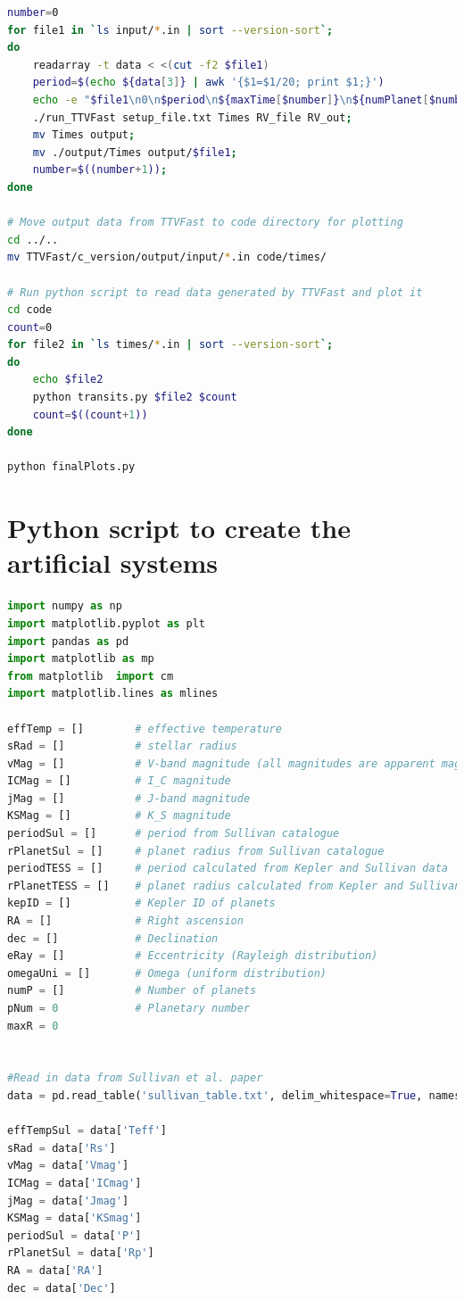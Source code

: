 \documentclass[12pt]{report}
\begin{document}
\begin{appendix}
\begin{lstlisting}[language=Bash]
number=0
for file1 in `ls input/*.in | sort --version-sort`;
do
	readarray -t data < <(cut -f2 $file1)
	period=$(echo ${data[3]} | awk '{$1=$1/20; print $1;}')
	echo -e "$file1\n0\n$period\n${maxTime[$number]}\n${numPlanet[$number]}\n0" > setup_file.txt;  		
	./run_TTVFast setup_file.txt Times RV_file RV_out;
	mv Times output;
	mv ./output/Times output/$file1;
	number=$((number+1));
done

# Move output data from TTVFast to code directory for plotting
cd ../..
mv TTVFast/c_version/output/input/*.in code/times/

# Run python script to read data generated by TTVFast and plot it
cd code
count=0
for file2 in `ls times/*.in | sort --version-sort`;
do
	echo $file2
	python transits.py $file2 $count
	count=$((count+1))
done

python finalPlots.py
\end{lstlisting}
\chapter{Python script to create the artificial systems}
\begin{lstlisting}[language=Python]
import numpy as np
import matplotlib.pyplot as plt
import pandas as pd
import matplotlib as mp
from matplotlib  import cm
import matplotlib.lines as mlines

effTemp = []		# effective temperature
sRad = [] 			# stellar radius
vMag = []			# V-band magnitude (all magnitudes are apparent magnitude)
ICMag = []			# I_C magnitude
jMag = []			# J-band magnitude
KSMag = []			# K_S magnitude
periodSul = []		# period from Sullivan catalogue
rPlanetSul = []		# planet radius from Sullivan catalogue
periodTESS = []		# period calculated from Kepler and Sullivan data
rPlanetTESS = []	# planet radius calculated from Kepler and Sullivan data
kepID = []			# Kepler ID of planets
RA = []				# Right ascension
dec = []			# Declination
eRay = []			# Eccentricity (Rayleigh distribution)
omegaUni = []		# Omega (uniform distribution)
numP = []			# Number of planets
pNum = 0			# Planetary number
maxR = 0


#Read in data from Sullivan et al. paper
data = pd.read_table('sullivan_table.txt', delim_whitespace=True, names=('RA', 'Dec', 'Rp', 'P', 'P insu', 'Rad v', 'Rs', 'Teff', 'Vmag', 'ICmag', 'Jmag', 'KSmag', 'Dmod', 'Dil p', 'devi flux', 'Sig-noi', 'NumPl'))

effTempSul = data['Teff']
sRad = data['Rs']
vMag = data['Vmag']
ICMag = data['ICmag']
jMag = data['Jmag']
KSMag = data['KSmag']
periodSul = data['P']
rPlanetSul = data['Rp']
RA = data['RA']
dec = data['Dec']


\end{lstlisting}
\end{appendix}
\end{document}
